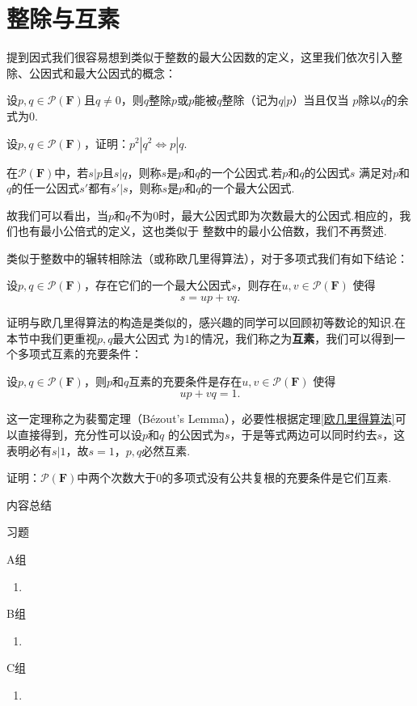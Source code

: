 \section{整除与互素}
提到因式我们很容易想到类似于整数的最大公因数的定义，这里我们依次引入整除、公因式和最大公因式的概念：
\begin{definition}
	设$p,q\in\mathcal{P}(\mathbf{F})$且$q\neq 0$，则$q$整除$p$或$p$能被$q$整除（记为$q|p$）当且仅当
	$p$除以$q$的余式为$0$.
\end{definition}
\begin{example}
	设$p,q\in\mathcal{P}(\mathbf{F})$，证明：$p^2|q^2\iff p|q$.
\end{example}
\begin{definition}
	在$\mathcal{P}(\mathbf{F})$中，若$s|p$且$s|q$，则称$s$是$p$和$q$的一个公因式.若$p$和$q$的公因式$s$
	满足对$p$和$q$的任一公因式$s'$都有$s'|s$，则称$s$是$p$和$q$的一个最大公因式.
\end{definition}
故我们可以看出，当$p$和$q$不为0时，最大公因式即为次数最大的公因式.相应的，我们也有最小公倍式的定义，这也类似于
整数中的最小公倍数，我们不再赘述.

类似于整数中的辗转相除法（或称欧几里得算法），对于多项式我们有如下结论：
\begin{theorem}\label{欧几里得算法}
	设$p,q\in\mathcal{P}(\mathbf{F})$，存在它们的一个最大公因式$s$，则存在$u,v\in\mathcal{P}(\mathbf{F})$
	使得$$s=up+vq.$$
\end{theorem}
证明与欧几里得算法的构造是类似的，感兴趣的同学可以回顾初等数论的知识.在本节中我们更重视$p,q$最大公因式
为1的情况，我们称之为\textbf{互素}，我们可以得到一个多项式互素的充要条件：
\begin{theorem}\label{裴蜀定理}
	设$p,q\in\mathcal{P}(\mathbf{F})$，则$p$和$q$互素的充要条件是存在$u,v\in\mathcal{P}(\mathbf{F})$
	使得$$up+vq=1.$$
\end{theorem}
这一定理称之为裴蜀定理（Bézout's Lemma），必要性根据定理\ref{欧几里得算法}可以直接得到，充分性可以设$p$和$q$
的公因式为$s$，于是等式两边可以同时约去$s$，这表明必有$s|1$，故$s=1$，$p,q$必然互素.
\begin{example}
	证明：$\mathcal{P}(\mathbf{F})$中两个次数大于$0$的多项式没有公共复根的充要条件是它们互素.
\end{example}

\vspace{2ex} 
\centerline{\heiti \Large 内容总结}

\vspace{2ex} 

\centerline{\heiti \Large 习题}
\vspace{2ex} 
{\kaishu }
\begin{flushright}
    \kaishu

\end{flushright}
\centerline{\heiti A组}
\begin{enumerate}
	\item 
\end{enumerate}
\centerline{\heiti B组}
\begin{enumerate}
	\item 
\end{enumerate}
\centerline{\heiti C组}
\begin{enumerate}
	\item 
\end{enumerate}